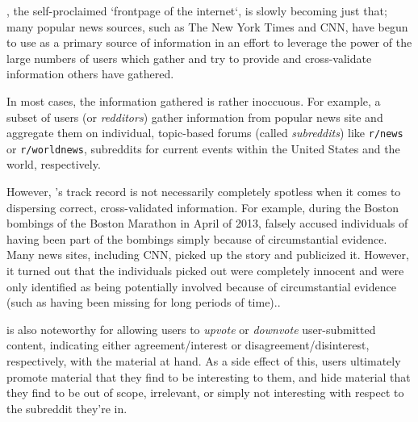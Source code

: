 \reddit{}, the self-proclaimed `frontpage of the internet`, is slowly becoming
just that; many popular news sources, such as The New York Times and CNN, have
begun to use \reddit{} as a primary source of information in an effort to
leverage the power of the large numbers of users which gather and try to provide
and cross-validate information others have gathered.

In most cases, the information gathered is rather inoccuous. For example, a
subset of \reddit{} users (or \textit{redditors}) gather information from
popular news site and aggregate them on individual, topic-based forums (called
\textit{subreddits}) like \texttt{r/news} or \texttt{r/worldnews}, subreddits
for current events within the United States and the world, respectively.

However, \reddit{}'s track record is not necessarily completely spotless when it
comes to dispersing correct, cross-validated information. For example, during
the Boston bombings of the Boston Marathon in April of 2013, \reddit{} falsely
accused individuals of having been part of the bombings simply because of
circumstantial evidence. Many news sites, including CNN, picked up the story and
publicized it. However, it turned out that the individuals \reddit{} picked out
were completely innocent and were only identified as being potentially involved
because of circumstantial evidence (such as having been missing for long periods
of time).\cite{Potts:2013:IRC:2507065.2507079}.

\reddit{} is also noteworthy for allowing users to \textit{upvote} or
\textit{downvote} user-submitted content, indicating either agreement/interest
or disagreement/disinterest, respectively, with the material at hand. As a side
effect of this, users ultimately promote material that they find to be
interesting to them, and hide material that they find to be out of scope,
irrelevant, or simply not interesting with respect to the subreddit they're in.\cite{Gilbert:2013:WUR:2441776.2441866}
